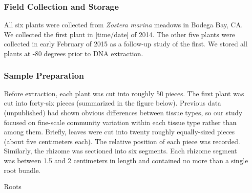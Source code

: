 
\subsubsection{Field Collection and Storage}

All six plants were collected from \textit{Zostera marina} meadows in Bodega Bay, CA. We collected the first plant in [time/date] of 2014. The other five plants were collected in early February of 2015 as a follow-up study of the first. We stored all plants at -80 degrees prior to DNA extraction. 

\subsubsection{Sample Preparation}

Before extraction, each plant was cut into roughly 50 pieces. The first plant was cut into forty-six pieces (summarized in the figure below). Previous data (unpublished) had shown obvious differences between tissue types, so our study focused on fine-scale community variation within each tissue type rather than among them. Briefly, leaves were cut into twenty roughly equally-sized pieces (about five centimeters each). The relative position of each piece was recorded. Similarly, the rhizome was sectioned into six segments. Each rhizome segment was between 1.5 and 2 centimeters in length and contained no more than a single root bundle.

Roots
    
    
    
